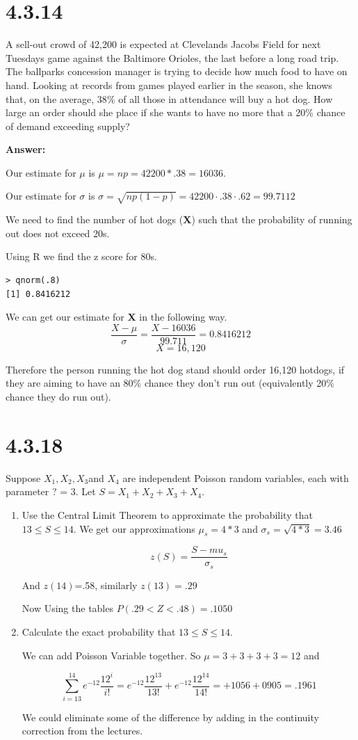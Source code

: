 \documentclass[svgnames]{article}
\begin{document}
\section{4.3.14}
A sell-out crowd of 42,200 is expected at Cleveland\textsc{}s Jacobs Field for next Tuesday\textsc{}s game against the Baltimore Orioles, the last before a long road trip. The ballpark\textsc{}s concession manager is trying to decide how much food to have on hand. Looking at records from games played earlier in the season, she knows that, on the average, 38$\%$ of all those in attendance will buy a hot dog. How large an order should she place if she wants to have no more that a 20\% chance of demand exceeding supply?

\textbf{Answer:}

Our estimate for $\mu$ is $\mu=np=42200*.38=16036$.

Our estimate for $\sigma$ is $\sigma=\sqrt{np(1-p)}=42200\cdot.38\cdot.62=99.7112$

We need to find the number of hot dogs (\textbf{X}) such that the probability of running out does not exceed 20\textsc{}s.

Using R we find the z score for 80\textsc{}s.
\begin{lstlisting}
> qnorm(.8)
[1] 0.8416212
\end{lstlisting}

We can get our estimate for \textbf{X} in the following way.
$$\frac{X-\mu}{\sigma}=\frac{X-16036}{99.711}=0.8416212 $$
$$X=16,120$$

Therefore the person running the hot dog stand should order 16,120 hotdogs, if they are aiming to have an 80\% chance they don't run out (equivalently 20\% chance they do run out).

\section{4.3.18}
 Suppose $X_1,X_2,X_3$and $X_4$ are independent Poisson random variables, each with parameter ? = 3. Let $S = X_1 +X_2 +X_3 +X_4$.
\begin{enumerate}[label=(\alph*)]
\item
Use the Central Limit Theorem to approximate the probability that $13 \leq S \leq 14$. 
We get our approximations $\mu_s= 4*3$ and $\sigma_s=\sqrt{4*3}=3.46$

$$z(S)=\frac{S-mu_s}{\sigma_s}$$

And $z(14)$=.58, similarly $z(13)=.29$

Now Using the tables $P(.29<Z<.48)=.1050$


\item Calculate the exact probability that $13 \leq S \leq 14$. 

We can add Poisson Variable together. So $\mu=3+3+3+3=12$ and 

$$\sum_{i=13}^{14}e^{-12}\frac{12^i}{i!}=e^{-12}\frac{12^{13}}{13!}+e^{-12}\frac{12^{14}}{14!}=+1056+0905=.1961$$

We could eliminate some of the difference by adding in the continuity correction from the lectures. 

\end{enumerate}
\end{document}
